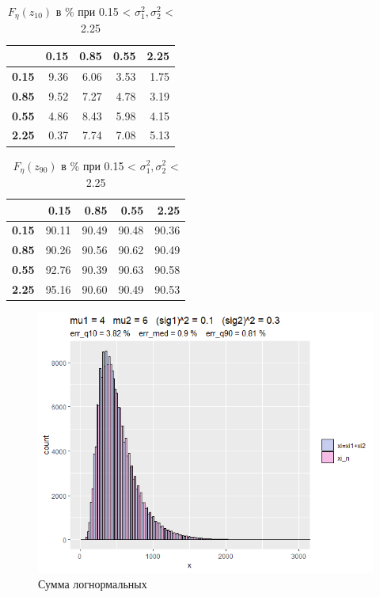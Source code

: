 \documentclass[12pt]{article}
\begin{document}
\begin{table}[]
	\centering
	\caption{$F_{\eta}(z_{10})$ в \% при 0.15 < $\sigma_{1}^{2}, \sigma_{2}^{2}$ < 2.25 }
	\begin{tabular}{rrrrr}
		\hline
		& \textbf{0.15} & \textbf{0.85} & \textbf{0.55} & \textbf{2.25} \\ 
		\hline
		\textbf{0.15} & 9.36 & 6.06 & 3.53 & 1.75 \\ 
		\textbf{0.85} & 9.52 & 7.27 & 4.78 & 3.19 \\ 
		\textbf{0.55} & 4.86 & 8.43 & 5.98 & 4.15 \\ 
		\textbf{2.25} & 0.37 & 7.74 & 7.08 & 5.13 \\ 
		\hline
	\end{tabular}
\end{table}

\begin{table}[]
	\centering
	\caption{$F_{\eta}(z_{90})$ в \% при 0.15 < $\sigma_{1}^{2}, \sigma_{2}^{2}$ < 2.25 }
	\begin{tabular}{rrrrr}
		\hline
		& \textbf{0.15} & \textbf{0.85} & \textbf{0.55} & \textbf{2.25} \\  
		\hline
		\textbf{0.15} & 90.11 & 90.49 & 90.48 & 90.36 \\ 
		\textbf{0.85} & 90.26 & 90.56 & 90.62 & 90.49 \\ 
		\textbf{0.55} & 92.76 & 90.39 & 90.63 & 90.58 \\ 
		\textbf{2.25} & 95.16 & 90.60 & 90.49 & 90.53 \\ 
		\hline
	\end{tabular}
\end{table}


\begin{figure}[h]
	\begin{center}
		
			\includegraphics[width=1\linewidth]{hist6.png}
			\caption{Сумма логнормальных} %
			\label{ris1} %
		
	\end{center}
\end{figure}
\end{document}
